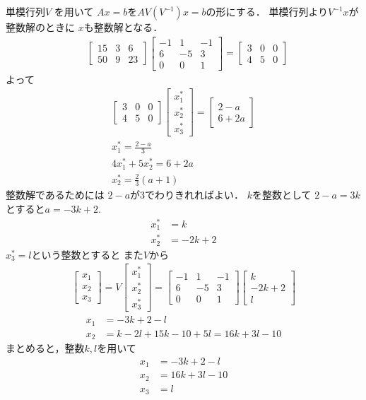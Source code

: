 単模行列$V$
を用いて
$Ax=b$を$AV(V^{-1})x=b$の形にする．
単模行列より$V^{-1}x$が整数解のときに
$x$も整数解となる．
\begin{align}
&
\begin{bmatrix}
15 & 3 & 6\\
50 & 9 & 23
\end{bmatrix}
\begin{bmatrix}
-1 & 1 & -1\\
6 & -5 & 3\\
0 & 0 & 1
\end{bmatrix}
=
\begin{bmatrix}
 3 & 0 & 0\\
 4 & 5  & 0
\end{bmatrix}
\end{align}
よって
\begin{align}
    \begin{bmatrix}
 3 & 0 & 0\\
 4 & 5  & 0
\end{bmatrix}
\begin{bmatrix}
 x^\ast_1\\
  x^\ast_2\\
   x^\ast_3
\end{bmatrix}
=   \begin{bmatrix}
    2 - a\\
    6 + 2a
\end{bmatrix}\\
 x^\ast_1 = \frac{2-a}{3}\\
 4 x^\ast_1 + 5  x^\ast_2 = 6+2a\\
  x^\ast_2 = \frac{2}{3}(a+1)
\end{align}
整数解であるためには
$2-a$が3でわりきれればよい．
$k$を整数として
$2-a = 3k$とすると$a = -3k+2$.
\begin{align}
    x^\ast_1 &= k\\
    x^\ast_2 &= -2k+2
\end{align}
$x^\ast_3 = l$という整数とすると
また$V$から
\begin{align}
\begin{bmatrix}
 x_1\\
 x_2\\
 x_3
\end{bmatrix}
= V \begin{bmatrix}
 x^\ast_1\\
 x^\ast_2\\
 x^\ast_3
\end{bmatrix}
=\begin{bmatrix}
 -1 & 1 & -1\\
6 & -5 & 3\\
0 & 0 & 1
\end{bmatrix}
\begin{bmatrix}
 k\\
-2k+2\\
l
\end{bmatrix}
\end{align}
\begin{align}
    x_1 &= -3k+2-l\\
    x_2 &= k -2l + 15k- 10 +5l
    = 16k +3l - 10 
\end{align}
まとめると，整数$k,l$を用いて
\begin{align}
    x_1 &=  -3k+2-l\\
    x_2 &= 16k +3l - 10 \\
    x_3 &= l
\end{align}